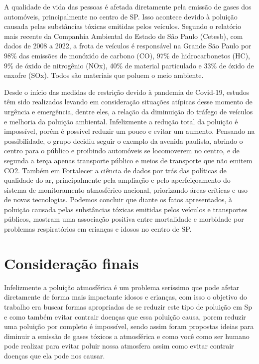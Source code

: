\documentclass[
	article,			%
	11pt,				%
	oneside,			%
	a4paper,			%
	english,			%
	brazil,				%
	sumario=tradicional
	]{abntex2}
\begin{document}
A qualidade de vida das pessoas é afetada diretamente pela emissão de gases dos automóveis, principalmente no centro de SP. Isso acontece devido à poluição causada pelas substâncias tóxicas emitidas pelos veículos. Segundo o relatório mais recente da Companhia Ambiental do Estado de São Paulo (Cetesb), com dados de 2008 a 2022, a frota de veículos é responsável na Grande São Paulo por 98\% das emissões de monóxido de carbono (CO), 97\% de hidrocarbonetos (HC), 9\% de óxido de nitrogênio (NOx), 40\% de material particulado e 33\% de óxido de enxofre (SOx). Todos são materiais que poluem o meio ambiente.

Desde o início das medidas de restrição devido à pandemia de Covid-19, estudos têm sido realizados levando em consideração situações atípicas desse momento de urgência e emergência, dentre eles, a relação da diminuição do tráfego de veículos e melhoria da poluição ambiental.  Infelizmente a redução total da poluição é impossível, porém é possível reduzir um pouco e evitar um aumento. Pensando na possibilidade, o grupo decidiu seguir  o exemplo da avenida paulista, abrindo o centro para o público e proibindo automóveis se locomoverem no centro, e de segunda a terça apenas transporte público e meios de transporte que não emitem CO2.  Também em Fortalecer a ciência de dados por trás das políticas de qualidade do ar, principalmente pela ampliação e pelo aperfeiçoamento do sistema de monitoramento atmosférico nacional, priorizando áreas críticas e uso de novas tecnologias.
Podemos concluir que diante os fatos apresentados, à poluição causada pelas substâncias tóxicas emitidas pelos veículos e transportes públicos, mostram uma associação positiva entre mortalidade e morbidade por problemas respiratórios em crianças e idosos no centro de SP.


\section{Consideração finais}
Infelizmente a poluição atmosférica é um problema seríssimo que pode afetar diretamente de forma mais impactante idosos e crianças, com isso o objetivo do trabalho era buscar formas apropriadas de se reduzir este tipo de poluição em Sp e como também evitar contrair doenças que essa poluição causa, porem reduzir uma poluição por completo é impossível, sendo assim foram propostas ideias para diminuir a emissão de gases tóxicos a atmosférica e como você como ser humano pode realizar para evitar poluir nossa atmosfera assim como evitar contrair doenças que ela pode nos causar.  
\end{document}
